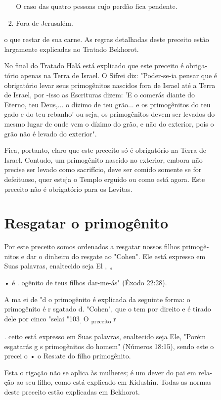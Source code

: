 \begin{itemize}
\begin{enumrate}
\begin{itemize}
\begin{itemize}
\begin{enumerate}
 O caso das quatro pessoas cujo perdão fica pendente.
 
\item
 
 Fora de Jerusalém.
 
\end{enumerate}




o que restar de sua carne. As regras detalhadas deste preceito estão
largamente explicadas no Tratado Bekhorot.

No final do Tratado Halá está explicado que este preceito é obriga­tório
apenas na Terra de Israel. O Sifrei diz: "Poder-se-ia pensar que é
obrigató­rio levar seus primogênitos nascidos fora de Israel até a Terra
de Israel, por -isso as Escrituras dizem: 'E o comerás diante do Eterno,
teu Deus,... o dízimo de teu grão... e os primogênitos do teu gado e do
teu rebanho' ou seja, os primo­gênitos devem ser levados do mesmo lugar
de onde vem o dízimo do grão, e não do exterior, pois o grão não é
levado do exterior".

Fica, portanto, claro que este preceito só é obrigatório na Terra de
Israel. Contudo, um primogênito nascido no exterior, embora não precise
ser levado como sacrifício, deve ser comido somente se for defeituoso,
quer esteja o Templo erguido ou como está agora. Este preceito não é
obrigatório para os Levitas.

\section{Resgatar o primogênito}

Por este preceito somos ordenados a resgatar nossos filhos primogê­nitos
e dar o dinheiro do resgate ao "Cohen". Ele está expresso em Suas
palavras, enaltecido seja El , „


• é . ogênito de teus filhos dar-me-ás" (Êxodo 22:28).


A ma ei de "d o primogênito é explicada da seguinte forma: o primogênito
é r sgatado d. "Cohen", que o tem por direito e é tirado dele por cinco
"selai "103\textsubscript{.} O \textsubscript{preceito} r

. ceito está expresso em Suas palavras, enaltecido seja Ele, "Porém
esgatarás g s primogênitos do homem" (Números 18:15), sen­do este o
precei o • o Res:ate do filho primogênito.

Esta o rigação não se aplica às mulheres; é um dever do pai em rela­ção
ao seu filho, como está explicado em Kidushin. Todas as normas deste
pre­ceito estão explicadas em Bekhorot.


\end{itemize}
\end{itemize}
\end{enumrate}
\end{itemize}
